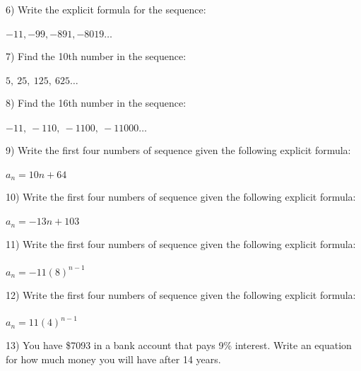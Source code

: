 \documentclass[12pt]{article}
\begin{document}
\hrulefill



6) Write the explicit formula for the sequence: \\ \\
$-11, -99, -891, -8019\ldots $


\hrulefill






7) Find the 10th number in the sequence: \\ \\
$5,~25,~125,~625\ldots $


\hrulefill




8) Find the 16th number in the sequence: \\ \\
$-11,~-110,~-1100,~-11000\ldots $


\hrulefill





9) Write the first four numbers of sequence given the following explicit formula: \\ \\
$a_n = 10n + 64$ 


\hrulefill



10) Write the first four numbers of sequence given the following explicit formula: \\ \\
$a_n = -13n + 103$ 


\hrulefill





11) Write the first four numbers of sequence given the following
explicit formula: \\  \\
$a_n = -11(8)^{n-1}$
 

\hrulefill



12) Write the first four numbers of sequence given the following
explicit formula: \\  \\
$a_n = 11(4)^{n-1}$
 

\hrulefill








13) You have \$7093 in a bank account that pays 9\% interest. Write an equation for how much money you will have after 14 years. \\ \\
 
\end{document}
